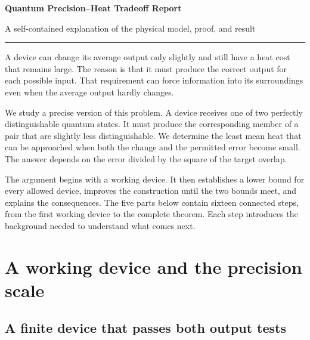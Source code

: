 \documentclass[11pt,letterpaper]{article}
\begin{document}
{\sffamily\bfseries\color{ink}\fontsize{22}{27}\selectfont Quantum Precision--Heat Tradeoff Report\par}
\vspace{3pt}
{\sffamily\small\color{graytext}A self-contained explanation of the physical model, proof, and result\par}
\vspace{7pt}
\vspace{7pt}
\noindent\color{teal}\rule{\linewidth}{0.85pt}\color{ink}
\vspace{4pt}



A device can change its average output only slightly and still have a heat cost that remains large. The reason is that it must produce the correct output for each possible input. That requirement can force information into its surroundings even when the average output hardly changes.

We study a precise version of this problem. A device receives one of two perfectly distinguishable quantum states. It must produce the corresponding member of a pair that are slightly less distinguishable. We determine the least mean heat that can be approached when both the change and the permitted error become small. The answer depends on the error divided by the square of the target overlap.

The argument begins with a working device. It then establishes a lower bound for every allowed device, improves the construction until the two bounds meet, and explains the consequences. The five parts below contain sixteen connected steps, from the first working device to the complete theorem. Each step introduces the background needed to understand what comes next.

\vspace{3pt}
\begingroup
\setlength{\parskip}{0pt}
\small
\tableofcontents
\endgroup
\clearpage

\section{A working device and the precision scale}\label{sec:device}

\subsection{A finite device that passes both output tests}\label{subsec:finite-device}
\end{document}
